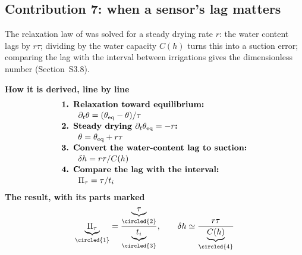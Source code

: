 \subsection{Contribution 7: when a sensor's lag matters}
\begin{derivation}
The relaxation law of \citet{RossSmettem2000} was solved for a steady drying rate $r$: the water content lags by $r\tau$; dividing by the water capacity $C(h)$ turns this into a suction error; comparing the lag with the interval between irrigations gives the dimensionless number (Section~S3.8).
\end{derivation}
\begin{keyresult}
\begin{pencil}
{\small\noindent\textbf{How it is derived, line by line}
\[\begin{array}{@{}l@{}}\textbf{1. Relaxation toward equilibrium:}\\[1pt]
\qquad \partial_t\theta=(\theta_{\mathrm{eq}}-\theta)/\tau\\[1pt]
\textbf{2. Steady drying } \partial_t\theta_{\mathrm{eq}}=-r\textbf{:}\\[1pt]
\qquad \theta=\theta_{\mathrm{eq}}+r\tau\\[1pt]
\textbf{3. Convert the water-content lag to suction:}\\[1pt]
\qquad \delta h=r\tau/C(h)\\[1pt]
\textbf{4. Compare the lag with the interval:}\\[1pt]
\qquad \Pi_\tau=\tau/t_i
\end{array}\]}
\noindent\textbf{The result, with its parts marked}
\[\underbrace{\Pi_\tau}_{\circled{1}}=\frac{\underbrace{\tau}_{\circled{2}}}{\underbrace{t_i}_{\circled{3}}},\qquad \delta h\simeq\frac{r\tau}{\underbrace{C(h)}_{\circled{4}}}\]
\end{pencil}
\end{keyresult}
\begin{pins}
\end{pins}
